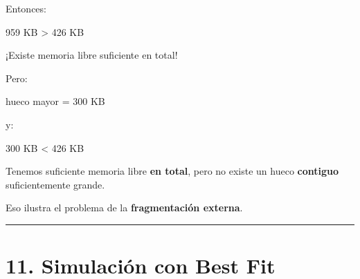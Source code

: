 \documentclass[
  spanish,
  letterpaper,
]{scrbook}
\newenvironment{Shaded}{\begin{snugshade}}{\end{snugshade}}
\newcommand{\NormalTok}[1]{\textcolor[rgb]{0.00,0.23,0.31}{#1}}
\begin{document}
Entonces:

\begin{Shaded}
\begin{Highlighting}[]
\NormalTok{959 KB \textgreater{} 426 KB}
\end{Highlighting}
\end{Shaded}

¡Existe memoria libre suficiente en total!

Pero:

\begin{Shaded}
\begin{Highlighting}[]
\NormalTok{hueco mayor = 300 KB}
\end{Highlighting}
\end{Shaded}

y:

\begin{Shaded}
\begin{Highlighting}[]
\NormalTok{300 KB \textless{} 426 KB}
\end{Highlighting}
\end{Shaded}

\begin{tcolorbox}[enhanced jigsaw, arc=.35mm, bottomrule=.15mm, bottomtitle=1mm, breakable, colback=white, colbacktitle=quarto-callout-important-color!10!white, colframe=quarto-callout-important-color-frame, coltitle=black, left=2mm, leftrule=.75mm, opacityback=0, opacitybacktitle=0.6, rightrule=.15mm, title=\textcolor{quarto-callout-important-color}{\faExclamation}\hspace{0.5em}{Este es el punto clave}, titlerule=0mm, toprule=.15mm, toptitle=1mm]

Tenemos suficiente memoria libre \textbf{en total}, pero no existe un
hueco \textbf{contiguo} suficientemente grande.

Eso ilustra el problema de la \textbf{fragmentación externa}.

\end{tcolorbox}

\begin{center}\rule{0.5\linewidth}{0.5pt}\end{center}


\chapter{11. Simulación con Best
Fit}\label{simulaciuxf3n-con-best-fit-1}
\end{document}
